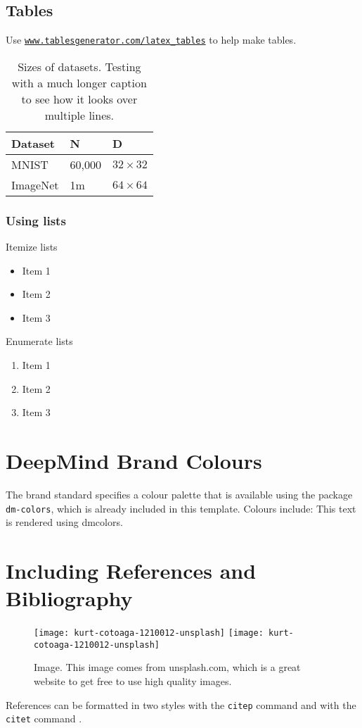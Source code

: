 \subsection{Tables}
Use \href{https://www.tablesgenerator.com/latex_tables}{\texttt{www.tablesgenerator.com/latex\_tables}} to help make tables.

\begin{table}[tb]
	\centering
	\caption{Sizes of datasets. Testing with a much longer caption to see how it looks over 
	multiple lines. }
	\begin{tabular}{lll}
		\hline
		Dataset  & N      & D            \\
		\hline \hline
		MNIST    & 60,000 & $32\times32$ \\
		ImageNet & 1m     & $64\times64$\\
		\hline
	\end{tabular}
\end{table}

\subsubsection{Using lists}
%
Itemize lists
\begin{itemize}
	\item Item 1
    \item Item 2
	\item Item 3
\end{itemize}

\noindent Enumerate lists
\begin{enumerate}
	\item Item 1
	\item Item 2
	\item Item 3
\end{enumerate}

\section{DeepMind Brand Colours}
The brand standard specifies a colour palette that is available using the package \texttt{dm-colors}, which is already included in this template. Colours include: \textcolor{dmblue400}{This} \textcolor{dmyellow500}{text} \textcolor{dmteal400}{is} \textcolor{dmpurple400}{rendered} \textcolor{dmred400}{using} \textcolor{dmorange400}{dmcolors}.

\section{Including References and Bibliography}
\begin{figure*}[t]
	\centering
	\texttt{[image: kurt-cotoaga-1210012-unsplash]}
	\texttt{[image: kurt-cotoaga-1210012-unsplash]}
	\caption{Image. This image comes from unsplash.com, which is a great website to get 
		free to use high quality images.}
	\label{fig:image2}
\end{figure*}
References can be formatted in two styles with the \texttt{citep}
command \citep{silver2016mastering} and with the \texttt{citet}
command \citet{silver2016mastering}.
